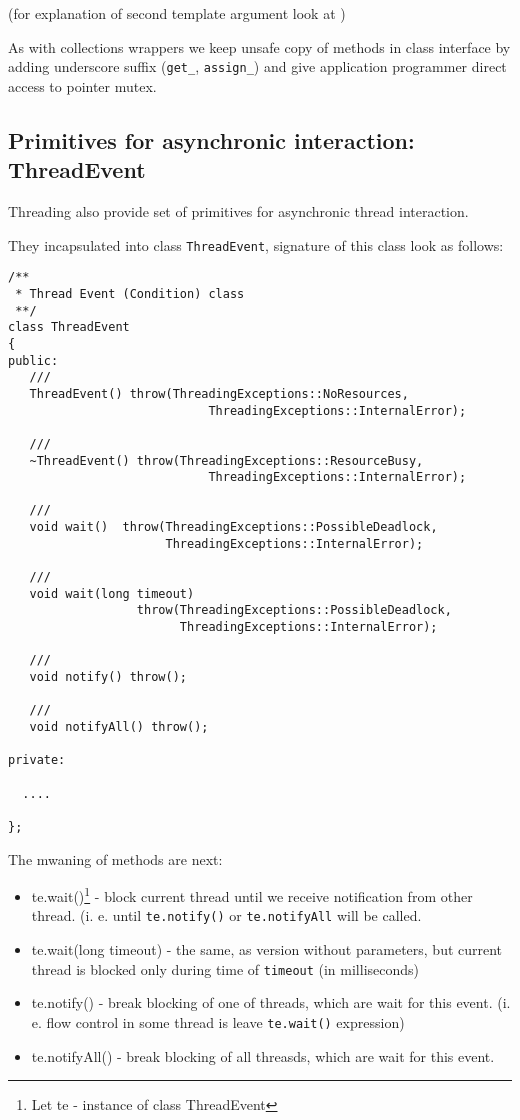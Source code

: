 \documentclass[10pt]{article}
\begin{document}
 (for explanation of second template argument look at \cite{ptrs})
 
 As with collections wrappers we keep unsafe copy of methods in class
interface by adding underscore suffix (\verb|get_|, \verb|assign_|) and
give application programmer direct access to pointer mutex.


\subsection{ Primitives for asynchronic interaction: ThreadEvent }

 Threading also provide set of primitives for asynchronic thread interaction.

 They incapsulated into class \verb|ThreadEvent|, signature of this
class look as follows:

\begin{verbatim}
/**
 * Thread Event (Condition) class
 **/
class ThreadEvent
{
public:
   ///
   ThreadEvent() throw(ThreadingExceptions::NoResources,
                            ThreadingExceptions::InternalError);

   ///
   ~ThreadEvent() throw(ThreadingExceptions::ResourceBusy,
                            ThreadingExceptions::InternalError);

   ///
   void wait()  throw(ThreadingExceptions::PossibleDeadlock,
                      ThreadingExceptions::InternalError);

   ///
   void wait(long timeout)
                  throw(ThreadingExceptions::PossibleDeadlock,
                        ThreadingExceptions::InternalError);

   ///
   void notify() throw();

   ///
   void notifyAll() throw();

private:

  ....

};
\end{verbatim}

 The mwaning of methods are next:
 \begin{itemize} 
  \item te.wait()\footnote{ Let te - instance of class ThreadEvent}
   - block current thread until we receive notification from other thread.
   (i. e. until \verb|te.notify()| or \verb|te.notifyAll| will be called.
  \item te.wait(long timeout) - the same, as version without parameters,
   but current thread is blocked only during time of \verb|timeout| 
   (in milliseconds)
  \item te.notify() - break blocking of one of threads, which are wait
    for this event. (i. e. flow control in some thread is leave 
    \verb|te.wait()| expression)
  \item te.notifyAll() - break blocking of all threasds, which are
    wait for this event.
 \end{itemize} 
\end{document}
